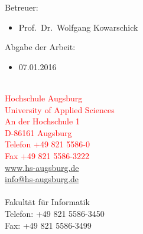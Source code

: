 \begin{minipage}[t]{0.70\textwidth}

	\begin{large}
		{\sffamily
			\Large Betreuer: 
			\Large
			\begin{itemize}[label={}]
				\item Prof.~Dr.~Wolfgang Kowarschick
			\end{itemize}
		}
		\Large
		\vspace{0.5cm}
		{\sffamily
			Abgabe der Arbeit:
			\begin{itemize}[label={}]
				\item 07.01.2016
			\end{itemize}
		}
	\end{large}
\end{minipage}%
	\hfill
\begin{minipage}[t]{0.35\textwidth}
	\begin{small}
	\textsf{
	    \textcolor{red}{
		\noindent
		\mbox{}\\
		Hochschule Augsburg\\
		University of Applied Sciences\\
		An der Hochschule 1\\
		D-86161 Augsburg\\
		Telefon +49 821 5586-0\\
		Fax +49 821 5586-3222\\
		\href{http://www.hs-augsburg.de}{www.hs-augsburg.de}\\
		\href{mailto:info@hs-augsburg.de}{info@hs-augsburg.de}}\\
		\\
		Fakultät für Informatik\\
		Telefon: +49 821 5586-3450\\
		Fax: +49 821 5586-3499
		}
	\end{small}
\end{minipage}%



\pagebreak